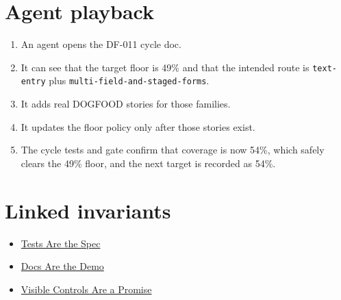 \section{Agent playback}\label{record-073-agent-playback}

\begin{enumerate}
\def\labelenumi{\arabic{enumi}.}
\tightlist
\item
  An agent opens the DF-011 cycle doc.
\item
  It can see that the target floor is 49\% and that the intended route is \texttt{t\allowbreak{}e\allowbreak{}x\allowbreak{}t\allowbreak{}-\allowbreak{}e\allowbreak{}n\allowbreak{}t\allowbreak{}r\allowbreak{}y} plus \texttt{m\allowbreak{}u\allowbreak{}l\allowbreak{}t\allowbreak{}i\allowbreak{}-\allowbreak{}f\allowbreak{}i\allowbreak{}e\allowbreak{}l\allowbreak{}d\allowbreak{}-\allowbreak{}a\allowbreak{}n\allowbreak{}d\allowbreak{}-\allowbreak{}s\allowbreak{}t\allowbreak{}a\allowbreak{}g\allowbreak{}e\allowbreak{}d\allowbreak{}-\allowbreak{}f\allowbreak{}o\allowbreak{}r\allowbreak{}m\allowbreak{}s}.
\item
  It adds real DOGFOOD stories for those families.
\item
  It updates the floor policy only after those stories exist.
\item
  The cycle tests and gate confirm that coverage is now 54\%, which safely clears the 49\% floor, and the next target is recorded as 54\%.
\end{enumerate}

\section{Linked invariants}\label{record-073-linked-invariants}

\begin{itemize}
\tightlist
\item
  \href{https://github.com/flyingrobots/bijou/blob/cbd70612140e7a450d764b3c7be1c6af878b99bc/docs/invariants/tests-are-the-spec.md}{Tests Are the Spec}
\item
  \href{https://github.com/flyingrobots/bijou/blob/cbd70612140e7a450d764b3c7be1c6af878b99bc/docs/invariants/docs-are-the-demo.md}{Docs Are the Demo}
\item
  \href{https://github.com/flyingrobots/bijou/blob/cbd70612140e7a450d764b3c7be1c6af878b99bc/docs/invariants/visible-controls-are-a-promise.md}{Visible Controls Are a Promise}
\end{itemize}

